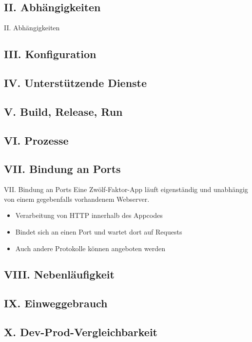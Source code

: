 \documentclass{beamer}
\begin{document}
			\subsection{II. Abhängigkeiten}
				\begin{frame}{II. Abhängigkeiten}
					
				\end{frame}
			\subsection{III. Konfiguration}
			\subsection{IV. Unterstützende Dienste}
			\subsection{V. Build, Release, Run}
			\subsection{VI. Prozesse}
			\subsection{VII. Bindung an Ports}
				\begin{frame}{VII. Bindung an Ports}
					Eine Zwölf-Faktor-App läuft eigenständig und unabhängig von einem gegebenfalls vorhandenem Webserver.

				\begin{itemize}
					\item Verarbeitung von HTTP innerhalb des Appcodes
			 		\item Bindet sich an einen Port und wartet dort auf Requests
					\item Auch andere Protokolle können angeboten werden
				\end{itemize}
			\end{frame}
			\subsection{VIII. Nebenläufigkeit}
			\subsection{IX. Einweggebrauch}
			\subsection{X. Dev-Prod-Vergleichbarkeit}
\end{document}

